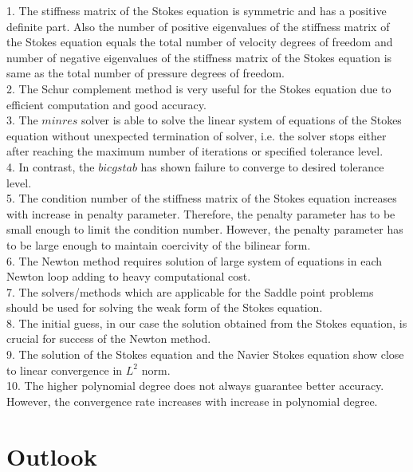 \documentclass[a4paper,twoside,openright]{book}
\begin{document}
1. The stiffness matrix of the Stokes equation is symmetric and has a positive definite part. Also the number of positive eigenvalues of the stiffness matrix of the Stokes equation equals the total number of velocity degrees of freedom and number of negative eigenvalues of the stiffness matrix of the Stokes equation is same as the total number of pressure degrees of freedom.\\

2. The Schur complement method is very useful for the Stokes equation due to efficient computation and good accuracy. \\

3. The $minres$ solver is able to solve the linear system of equations of the Stokes equation without unexpected termination of solver, i.e. the solver stops either after reaching the maximum number of iterations or specified tolerance level.\\

4. In contrast, the $bicgstab$ has shown failure to converge to desired tolerance level.\\

5. The condition number of the stiffness matrix of the Stokes equation increases with increase in penalty parameter. Therefore, the penalty parameter has to be small enough to limit the condition number. However, the penalty parameter has to be large enough to maintain coercivity of the bilinear form. \\

6. The Newton method requires solution of large system of equations in each Newton loop adding to heavy computational cost.\\

7. The solvers/methods which are applicable for the Saddle point problems should be used for solving the weak form of the Stokes equation.\\

8. The initial guess, in our case the solution obtained from the Stokes equation, is crucial for success of the Newton method.\\

9. The solution of the Stokes equation and the Navier Stokes equation show close to linear convergence in $L^2$ norm.\\

10. The higher polynomial degree does not always guarantee better accuracy. However, the convergence rate increases with increase in polynomial degree.

\section{Outlook}
\end{document}
